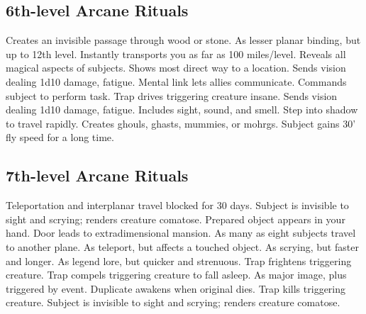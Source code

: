 \subsection{6th-level Arcane Rituals}
\begin{rituallist}
     Creates an invisible passage through wood or stone.
     As lesser planar binding, but up to 12th level.
     Instantly transports you as far as 100 miles/level.
      Reveals all magical aspects of subjects.
     Shows most direct way to a location.
     Sends vision dealing 1d10 damage, fatigue.
     Mental link lets allies communicate.
     Commands subject to perform task.
     Trap drives triggering creature insane.
     Sends vision dealing 1d10 damage, fatigue.
     Includes sight, sound, and smell.
     Step into shadow to travel rapidly.
     Creates ghouls, ghasts, mummies, or mohrgs.
     Subject gains 30' fly speed for a long time.
\end{rituallist}

\subsection{7th-level Arcane Rituals}
\begin{rituallist}
     Teleportation and interplanar travel blocked for 30 days.
     Subject is invisible to sight and scrying; renders creature comatose.
     Prepared object appears in your hand.
    \F Door leads to extradimensional mansion.
    \F As many as eight subjects travel to another plane.
     As teleport, but affects a touched object.
     As scrying, but faster and longer.
     As legend lore, but quicker and strenuous.
     Trap frightens triggering creature.
     Trap compels triggering creature to fall asleep.
     As major image, plus triggered by event.
    \F Duplicate awakens when original dies.
     Trap kills triggering creature.
     Subject is invisible to sight and scrying; renders creature comatose.
\end{rituallist}

